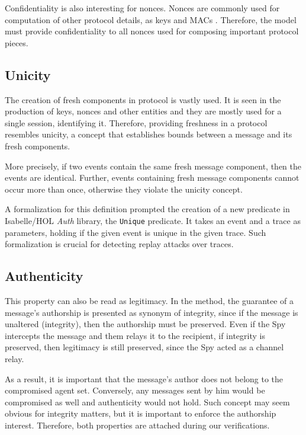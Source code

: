 Confidentiality is also interesting for nonces. Nonces are commonly used for computation of other protocol details, as keys and MACs \cite{bella-book}. Therefore, the model must provide confidentiality to all nonces used for composing important protocol pieces.


\subsection{Unicity}
The creation of fresh components in protocol is vastly used. It is seen in the production of keys, nonces and other entities and they are mostly used for a single session, identifying it. Therefore, providing freshness in a protocol resembles unicity, a concept that establishes bounds between a message and its fresh components.

More precisely, if two events contain the same fresh message component, then the events are identical. Further, events containing fresh message components cannot occur more than once, otherwise they violate the unicity concept.

A formalization for this definition prompted the creation of a new predicate in Isabelle/HOL \textit{Auth} library, the \texttt{Unique} predicate. It takes an event and a trace as parameters, holding if the given event is unique in the given trace. Such formalization is crucial for detecting replay attacks over traces.




\subsection{Authenticity}
This property can also be read as legitimacy. In the method, the guarantee of a message's authorship is presented as synonym of integrity, since if the message is unaltered (integrity), then the authorship must be preserved. Even if the Spy intercepts the message and them relays it to the recipient, if integrity is preserved, then legitimacy is still preserved, since the Spy acted as a channel relay.

As a result, it is important that the message's author does not belong to the compromised agent set. Conversely, any messages sent by him would be compromised as well and authenticity would not hold. Such concept may seem obvious for integrity matters, but it is important to enforce the authorship interest. Therefore, both properties are attached during our verifications.





